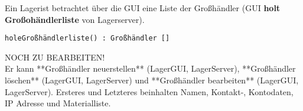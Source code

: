 Ein Lagerist betrachtet über die GUI eine Liste der Großhändler (GUI \textbf{holt Großohändlerliste} von Lagerserver).

\texttt{holeGroßhändlerliste() : Großhändler []}

NOCH ZU BEARBEITEN! \\
Er kann **Großhändler neuerstellen** (LagerGUI, LagerServer), **Großhändler löschen** (LagerGUI, LagerServer) und **Großhändler bearbeiten** (LagerGUI, LagerServer). Ersteres und Letzteres beinhalten Namen, Kontakt-, Kontodaten, IP Adresse und Materialliste. 